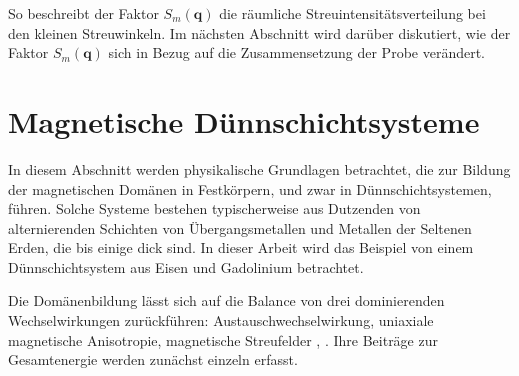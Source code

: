 \noindent
So beschreibt der Faktor $S_m(\mathbf{q})$ die räumliche Streuintensitätsverteilung bei den kleinen Streuwinkeln. Im nächsten Abschnitt wird darüber diskutiert, wie der Faktor $S_m(\mathbf{q})$ sich in Bezug auf die Zusammensetzung der Probe verändert.

\section{Magnetische Dünnschichtsysteme}
In diesem Abschnitt werden physikalische Grundlagen betrachtet, die zur Bildung der magnetischen Domänen in Festkörpern, und zwar in Dünnschichtsystemen, führen. Solche Systeme bestehen typischerweise aus Dutzenden von alternierenden Schichten von Übergangsmetallen und Metallen der Seltenen Erden, die bis einige  dick sind. In dieser Arbeit wird das Beispiel von einem Dünnschichtsystem aus Eisen und Gadolinium betrachtet.

\noindent
Die Domänenbildung lässt sich auf die Balance von drei dominierenden Wechselwirkungen zurückführen: Austauschwechselwirkung, uniaxiale magnetische Anisotropie, magnetische Streufelder \cite{hubert_magnetic_1998}, \cite{hellwig_domain_2007}. Ihre Beiträge zur Gesamtenergie werden zunächst einzeln erfasst.

